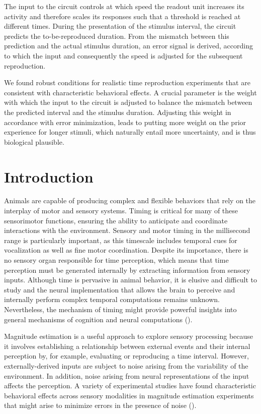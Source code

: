 \documentclass[10pt]{article}
\begin{document}
The input to the circuit controls at which speed the readout unit increases its activity and therefore scales its responses such that a threshold is reached at different times. 
During the presentation of the stimulus interval, the circuit predicts the to-be-reproduced duration. 
From the mismatch between this prediction and the actual stimulus duration, an error signal is derived, according to which the input and consequently the speed is adjusted for the subsequent reproduction.

We found robust conditions for realistic time reproduction experiments that are consistent with characteristic behavioral effects. 
A crucial parameter is the weight with which the input to the circuit is adjusted to balance the mismatch between the predicted interval and the stimulus duration. 
Adjusting this weight in accordance with error minimization, leads to putting more weight on the prior experience for longer stimuli, which naturally entail more uncertainty, and is thus biological plausible.

\pagebreak

\section{Introduction}
Animals are capable of producing complex and flexible behaviors that rely on the interplay of motor and sensory systems.
Timing is critical for many of these sensorimotor functions, ensuring the ability to anticipate and coordinate interactions with the environment.
Sensory and motor timing in the millisecond range is particularly important, as this timescale includes temporal cues for vocalization as well as fine motor coordination.
Despite its importance, there is no sensory organ responsible for time perception, which means that time perception must be generated internally by extracting information from sensory inputs.
Although time is pervasive in animal behavior, it is elusive and difficult to study and the neural implementation that allows the brain to perceive and internally perform complex temporal computations remains unknown.
Nevertheless, the mechanism of timing might provide powerful insights into general mechanisms of cognition and neural computations (\cite{Issa2020}).

Magnitude estimation is a useful approach to explore sensory processing because it involves establishing a relationship between external events and their internal perception by, for example, evaluating or reproducing a time interval. 
However, externally-derived inputs are subject to noise arising from the variability of the environment. In addition, noise arising from neural representations of the input affects the perception.
A variety of experimental studies have found characteristic behavioral effects across sensory modalities in magnitude estimation experiments that might arise to minimize errors in the presence of noise (\cite{Petzschner2015}).
\end{document}
